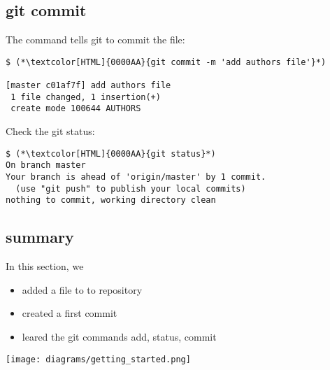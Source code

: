 \subsection{git commit}
\begin{frame}[fragile]
  \subslidetitle

  The command  tells git to commit the file:
  \begin{lstlisting}
$ (*\textcolor[HTML]{0000AA}{git commit -m 'add authors file'}*)

[master c01af7f] add authors file
 1 file changed, 1 insertion(+)
 create mode 100644 AUTHORS
\end{lstlisting}

  Check the git status:
  \begin{lstlisting}
$ (*\textcolor[HTML]{0000AA}{git status}*)
On branch master
Your branch is ahead of 'origin/master' by 1 commit.
  (use "git push" to publish your local commits)
nothing to commit, working directory clean
  \end{lstlisting}

\end{frame}

\subsection{summary}
\begin{frame}[fragile]
  \subslidetitle

  In this section, we

  \begin{itemize}
    \item added a file to to repository
    \item created a first commit
    \item leared the git commands add, status, commit
  \end{itemize}

  \vspace{1cm}
  \texttt{[image: diagrams/getting\_started.png]}

\end{frame}
